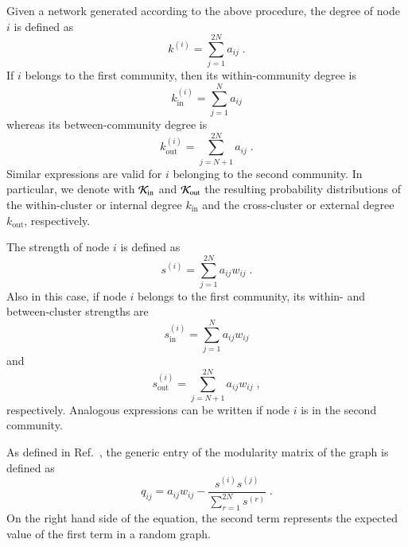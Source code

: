 \documentclass[a4paper,pre,superscriptaddress,floatfix,nofootinbib,twocolumn]{revtex4-1}
\begin{document}
Given a network generated according to the above procedure, the degree of node $i$ is defined as
\begin{equation}
    k^{(i)} = \sum_{j=1}^{2N} a_{ij} \; .
    \label{eq:degree}
\end{equation}
If $i$ belongs to the first community, then its within-community degree is
\begin{equation}
    k^{(i)}_\text{in} = \sum_{j=1}^{N} a_{ij}
    \label{eq:in_degree}
\end{equation}
whereas its between-community degree is
\begin{equation}
    k^{(i)}_\text{out} = \sum_{j=N+1}^{2N} a_{ij} \; .
    \label{eq:out_degree}
\end{equation}
Similar expressions are valid for $i$ belonging to the second community.
In particular, we denote with ${\cal K}_\text{in}$ and ${\cal K}_\text{out}$ the resulting probability distributions
of the within-cluster or internal degree $k_\text{in}$  and the cross-cluster or external degree $k_\text{out}$, respectively.

The strength of node $i$ is defined as
\begin{equation}
    s^{(i)} = \sum_{j=1}^{2N} a_{ij} w_{ij} \; .
    \label{eq:strength}
\end{equation}
Also in this case, if node $i$ belongs to the first community, its within- and between-cluster strengths are
\begin{equation}
    s^{(i)}_\text{in} = \sum_{j=1}^{N} a_{ij} w_{ij}
    \label{eq:in_strength}
\end{equation}
and
\begin{equation}
    s^{(i)}_\text{out} = \sum_{j=N+1}^{2N} a_{ij} w_{ij} \; ,
    \label{eq:out_strength}
\end{equation}
respectively. Analogous expressions can be written if node $i$ is in the second community.

As defined in Ref.~\cite{newman2006modularity},
the generic entry of the modularity matrix of the graph is defined as
\begin{equation}
q_{ij} = a_{ij} w_{ij} - \frac{s^{(i)} s^{(j)}}{ \sum_{r=1}^{2N} s^{(r)}} \; .
    \label{eq:modularity}
\end{equation}
On the right hand side of the equation,
the second term represents the expected value of the first term in a random graph.

\end{document}
